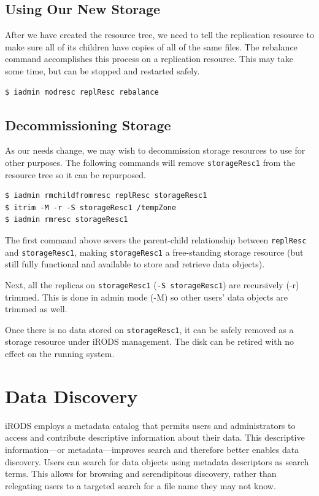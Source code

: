 \documentclass[10pt,oneside]{memoir}
\begin{document}
\section{Using Our New Storage}

After we have created the resource tree, we need to tell the replication resource to make sure all of its children have copies of all of the same files. The rebalance command accomplishes this process on a replication resource. This may take some time, but can be stopped and restarted safely.

\begin{lstlisting}
$ iadmin modresc replResc rebalance
\end{lstlisting}

\section{Decommissioning Storage}
As our needs change, we may wish to decommission storage resources to use for other purposes. The following commands will remove \texttt{storageResc1} from the resource tree so it can be repurposed.

\begin{lstlisting}
$ iadmin rmchildfromresc replResc storageResc1
$ itrim -M -r -S storageResc1 /tempZone
$ iadmin rmresc storageResc1
\end{lstlisting}

The first command above severs the parent-child relationship between \texttt{replResc} and \texttt{storageResc1}, making \texttt{storageResc1} a free-standing storage resource (but still fully functional and available to store and retrieve data objects).

Next, all the replicas on \texttt{storageResc1} (\texttt{-S storageResc1}) are recursively (-r) trimmed. This is done in admin mode (-M) so other users' data objects are trimmed as well.

Once there is no data stored on \texttt{storageResc1}, it can be safely removed as a storage resource under iRODS management. The disk can be retired with no effect on the running system.





\chapter{Data Discovery}

iRODS employs a metadata catalog that permits users and administrators to access and contribute descriptive information about their data. This descriptive information---or metadata---improves search and therefore better enables data discovery. Users can search for data objects using metadata descriptors as search terms. This allows for browsing and serendipitous discovery, rather than relegating users to a targeted search for a file name they may not know.
\end{document}
